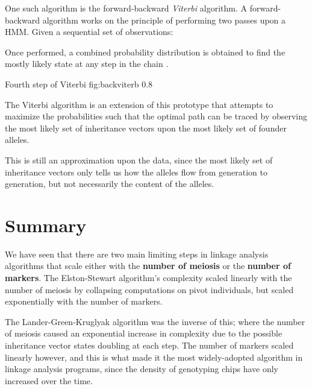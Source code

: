 One such algorithm is the forward-backward \textit{Viterbi} algorithm. A forward-backward algorithm works on the principle of performing two passes upon a HMM. Given a sequential set of observations:

\begin{enumerate}[labelsep=2em, align=right, labelwidth=3em, labelindent=4em, leftmargin=*]
\end{enumerate}

Once performed, a combined probability distribution is obtained to find the mostly likely state at any step in the chain \cite{viterbi1967error}.

	{Fourth step of Viterbi}
	{fig:backviterb}
	{0.8}
	{}


The Viterbi algorithm is an extension of this prototype that attempts to maximize the probabilities such that the optimal path can be traced by observing the most likely set of inheritance vectors upon the most likely set of founder alleles.

This is still an approximation upon the data, since the most likely set of inheritance vectors only tells us how the alleles flow from generation to generation, but not necessarily the content of the alleles.




\section{Summary}

We have seen that there are two main limiting steps in linkage analysis algorithms that scale either with the \textbf{number of meiosis} or the \textbf{number of markers}. The Elston-Stewart algorithm's complexity scaled linearly with the number of meiosis by collapsing computations on pivot individuals, but scaled exponentially with the number of markers. 

The Lander-Green-Kruglyak algorithm was the inverse of this; where  the number of meiosis caused an exponential increase in complexity due to the possible inheritance vector states doubling at each step.  The number of markers scaled linearly however, and this is what made it the most widely-adopted algorithm in linkage analysis programs, since the density of genotyping chips have only increased over the time.

